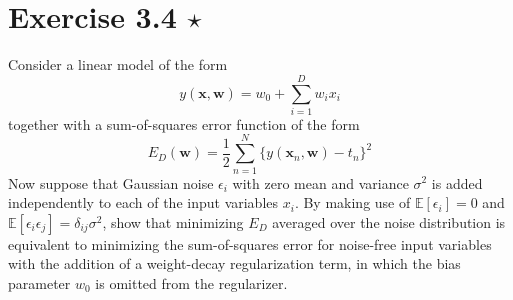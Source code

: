 \section*{Exercise 3.4 $\star$}
Consider a linear model of the form
\begin{equation*}
    y(\mathbf{x}, \mathbf{w}) = w_0 + \sum_{i=1}^{D} w_ix_i
    \tag{3.105}\label{eq:3.105}
\end{equation*}
together with a sum-of-squares error function of 
the form
\begin{equation*}
    E_D(\mathbf{w}) = \frac{1}{2} \sum_{n=1}^{N}
    \{y(\mathbf{x}_n, \mathbf{w}) - t_n\}^2
    \tag{3.106}\label{eq:3.106}
\end{equation*}
Now suppose that Gaussian noise $\epsilon_i$ with zero
mean and variance $\sigma^2$ is added independently
to each of the input variables $x_i$. By making
use of $\mathbb{E}[\epsilon_i] = 0$ and 
$\mathbb{E}[\epsilon_i\epsilon_j] = \delta_{ij}\sigma^2$,
show that minimizing $E_D$ averaged over the noise 
distribution is equivalent to minimizing the 
sum-of-squares error for noise-free input variables
with the addition of a weight-decay regularization term,
in which the bias parameter $w_0$ is omitted from
the regularizer.

\vspace{1em}


